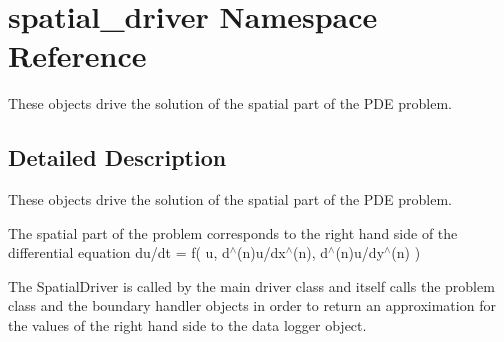 \hypertarget{namespacespatial__driver}{}\section{spatial\+\_\+driver Namespace Reference}
\label{namespacespatial__driver}


These objects drive the solution of the spatial part of the P\+DE problem.  




\subsection{Detailed Description}
These objects drive the solution of the spatial part of the P\+DE problem. 

The spatial part of the problem corresponds to the right hand side of the differential equation du/dt = f( u, d$^\wedge$(n)u/dx$^\wedge$(n), d$^\wedge$(n)u/dy$^\wedge$(n) )

The Spatial\+Driver is called by the main driver class and itself calls the problem class and the boundary handler objects in order to return an approximation for the values of the right hand side to the data logger object. 